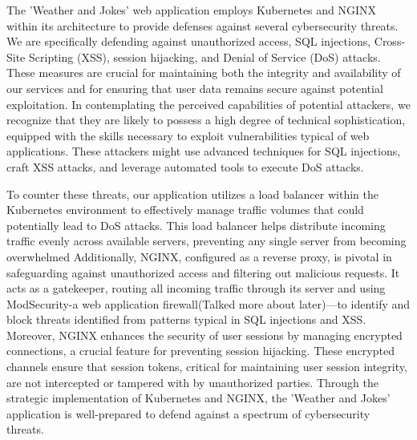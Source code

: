 The 'Weather and Jokes' web application employs Kubernetes and NGINX within its architecture to provide defenses against several cybersecurity threats. 
We are specifically defending against unauthorized access, SQL injections, Cross-Site Scripting (XSS), session hijacking, and Denial of Service (DoS) attacks. 
These measures are crucial for maintaining both the integrity and availability of our services and for ensuring that user data remains secure against potential exploitation.
In contemplating the perceived capabilities of potential attackers, we recognize that they are likely to possess a high degree of technical sophistication, equipped with the skills necessary to exploit vulnerabilities typical of web applications. 
These attackers might use advanced techniques for SQL injections, craft XSS attacks, and leverage automated tools to execute DoS attacks.

To counter these threats, our application utilizes a load balancer within the Kubernetes environment to effectively manage traffic volumes that could potentially lead to DoS attacks. 
This load balancer helps distribute incoming traffic evenly across available servers, preventing any single server from becoming overwhelmed
Additionally, NGINX, configured as a reverse proxy, is pivotal in safeguarding against unauthorized access and filtering out malicious requests. It acts as a gatekeeper, routing all incoming traffic through its server and using ModSecurity-a web application firewall(Talked more about later)—to identify and block threats identified from patterns typical in SQL injections and XSS. 
Moreover, NGINX enhances the security of user sessions by managing encrypted connections, a crucial feature for preventing session hijacking. 
These encrypted channels ensure that session tokens, critical for maintaining user session integrity, are not intercepted or tampered with by unauthorized parties.
Through the strategic implementation of Kubernetes and NGINX, the 'Weather and Jokes' application is well-prepared to defend against a spectrum of cybersecurity threats.
